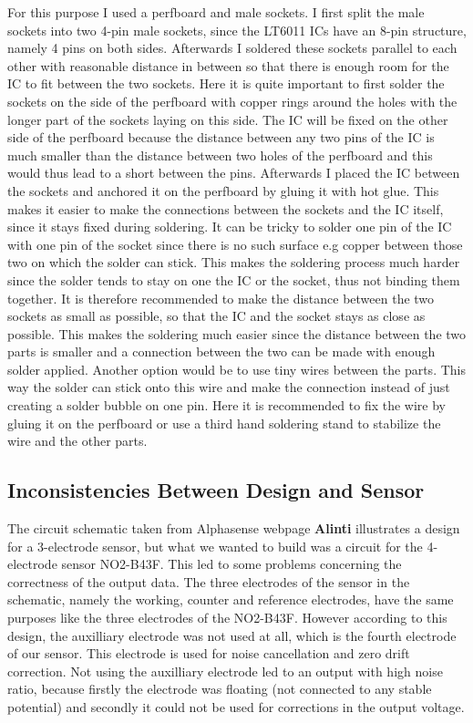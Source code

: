 For this purpose I used a perfboard and male sockets. I first split the male sockets into two 4-pin male sockets, since the LT6011 ICs have an 8-pin structure, namely 4 pins on both sides. Afterwards I soldered these sockets parallel to each other with reasonable distance in between so that there is enough room for the IC to fit between the two sockets. Here it is quite important to first solder the sockets on the side of the perfboard with copper rings around the holes with the longer part of the sockets laying on this side. The IC will be fixed on the other side of the perfboard because the distance between any two pins of the IC is much smaller than the distance between two holes of the perfboard and this would thus lead to a short between the pins. Afterwards I placed the IC between the sockets and anchored it on the perfboard by gluing it with hot glue. This makes it easier to make the connections between the sockets and the IC itself, since it stays fixed during soldering. It can be tricky to solder one pin of the IC with one pin of the socket since there is no such surface e.g copper between those two on which the solder can stick. This makes the soldering process much harder since the solder tends to stay on one the IC or the socket, thus not binding them together. It is therefore recommended to make the distance between the two sockets as small as possible, so that the IC and the socket stays as close as possible. This makes the soldering much easier since the distance between the two parts is smaller and a connection between the two can be made with enough solder applied. Another option would be to use tiny wires between the parts. This way the solder can stick onto this wire and make the connection instead of just creating a solder bubble on one pin. Here it is recommended to fix the wire by gluing it on the perfboard or use a third hand soldering stand to stabilize the wire and the other parts. 

\subsection{Inconsistencies Between Design and Sensor}

The circuit schematic taken from Alphasense webpage \textbf{Alinti} illustrates a design for a 3-electrode sensor, but what we wanted to build was a circuit for the 4-electrode sensor NO2-B43F. This led to some problems concerning the correctness of the output data. The three electrodes of the sensor in the schematic, namely the working, counter and reference electrodes, have the same purposes like the three electrodes of the NO2-B43F. However according to this design, the auxilliary electrode was not used at all, which is the fourth electrode of our sensor. This electrode is used for noise cancellation and zero drift correction. Not using the auxilliary electrode led to an output with high noise ratio, because firstly the electrode was floating (not connected to any stable potential) and secondly it could not be used for corrections in the output voltage. 

